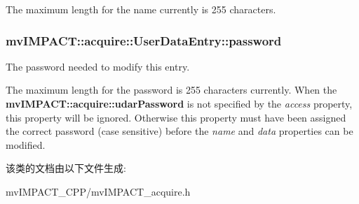 The maximum length for the name currently is 255 characters. \hypertarget{classmv_i_m_p_a_c_t_1_1acquire_1_1_user_data_entry_aae1a558c633261b0d2c72ab043421e83}{
\subsubsection[{password}]{ mv\+I\+M\+P\+A\+C\+T\+::acquire\+::\+User\+Data\+Entry\+::password}}\label{classmv_i_m_p_a_c_t_1_1acquire_1_1_user_data_entry_aae1a558c633261b0d2c72ab043421e83}


The password needed to modify this entry. 

The maximum length for the password is 255 characters currently. When the {\bfseries mv\+I\+M\+P\+A\+C\+T\+::acquire\+::udar\+Password} is not specified by the {\itshape access} property, this property will be ignored. Otherwise this property must have been assigned the correct password (case sensitive) before the {\itshape name} and {\itshape data} properties can be modified. 

该类的文档由以下文件生成\+:\begin{DoxyCompactItemize}
\item 
mv\+I\+M\+P\+A\+C\+T\+\_\+\+C\+P\+P/mv\+I\+M\+P\+A\+C\+T\+\_\+acquire.\+h\end{DoxyCompactItemize}
